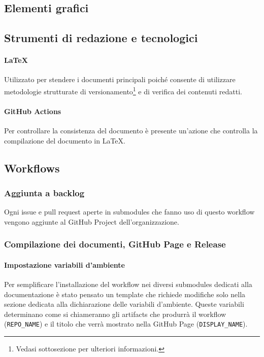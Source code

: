 \subsection{Elementi grafici}
\subsection{Strumenti di redazione e tecnologici}

\paragraph{\LaTeX} Utilizzato per stendere i documenti principali poiché consente di utilizzare metodologie strutturate di versionamento\footnote{Vedasi sottosezione  per ulteriori informazioni.} e di verifica dei contenuti redatti.

\paragraph{GitHub Actions} Per controllare la consistenza del documento è presente un'azione che controlla la compilazione del documento in \LaTeX.

\subsection{Workflows}

\subsubsection{Aggiunta a backlog}

Ogni issue e pull request aperte in submodules che fanno uso di questo workflow vengono aggiunte al GitHub Project dell'organizzazione.



\subsubsection{Compilazione dei documenti, GitHub Page e Release}

\paragraph{Impostazione variabili d'ambiente} Per semplificare l'installazione del workflow nei diversi submodules dedicati alla documentazione è stato pensato un template che richiede modifiche solo nella sezione dedicata alla dichiarazione delle variabili d'ambiente. Queste variabili determinano come si chiameranno gli artifacts che produrrà il workflow (\texttt{REPO\_NAME}) e il titolo che verrà mostrato nella GitHub Page (\texttt{DISPLAY\_NAME}).

